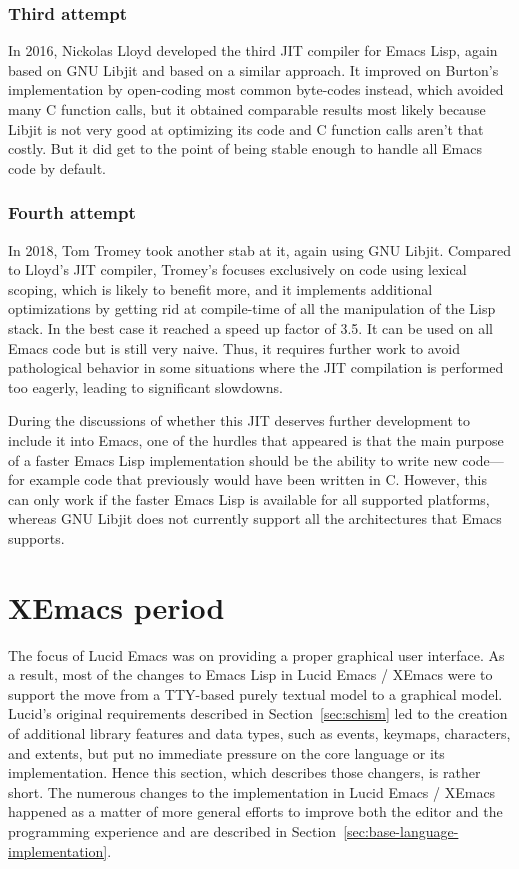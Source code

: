 \documentclass[format=acmsmall, review]{acmart}
\newcommand \Elisp {Emacs Lisp}
\begin{document}
\subsubsection*{Third attempt}
In 2016, Nickolas Lloyd developed the third JIT compiler for \Elisp, again
based on GNU Libjit and based on a similar approach.  It improved on
Burton's implementation by open-coding most common byte-codes instead, which
avoided many C function calls, but it obtained comparable results most
likely because Libjit is not very good at optimizing its code and C function
calls aren't that costly.  But it did get to the point of being stable enough
to handle all Emacs code by default.

\subsubsection*{Fourth attempt}
In 2018, Tom Tromey took another stab at it, again using GNU Libjit.
Compared to Lloyd's JIT compiler, Tromey's focuses exclusively on code using lexical scoping,
which is likely to benefit more, and it implements additional optimizations
by getting rid at compile-time of all the manipulation of the Lisp stack.
In the best case it reached a speed up factor of 3.5.
It can be used on all Emacs code but is still
very naive.  Thus, it requires further work to avoid
pathological behavior in some situations where the JIT compilation is
performed too eagerly, leading to significant slowdowns.

During the discussions of whether this JIT deserves further development to
include it into Emacs, one of the hurdles that appeared is that the main
purpose of a faster \Elisp{} implementation should be the ability to write
new code---for example code that previously would have been written in
C.  However, this can only work if the
faster \Elisp{} is available for all supported platforms, whereas GNU
Libjit does not currently support all the architectures that Emacs supports.


\section{XEmacs period}         %
\label{sec:xemacs}

The focus of Lucid Emacs was on providing a proper graphical user
interface.  As a result, most of the changes to \Elisp{} in Lucid
Emacs / XEmacs were to support the move from a TTY-based purely
textual model to a graphical model.  Lucid's original requirements
described in Section~\ref{sec:schism} led to the creation of
additional library features and data types, such as events, keymaps,
characters, and extents, but put no immediate pressure on the core
language or its implementation.  Hence this section, which describes
those changers, is rather short.  The numerous changes to the
implementation in Lucid Emacs / XEmacs happened as a matter of more
general efforts to improve both the editor and the programming
experience and are described in
Section~\ref{sec:base-language-implementation}.
\end{document}
